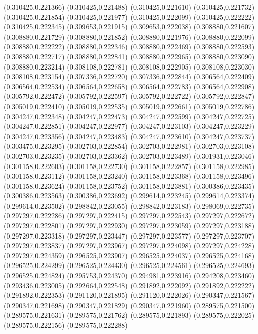(0.310425,0.221366)
(0.310425,0.221488)
(0.310425,0.221610)
(0.310425,0.221732)
(0.310425,0.221854)
(0.310425,0.221977)
(0.310425,0.222099)
(0.310425,0.222222)
(0.310425,0.222345)
(0.309653,0.221915)
(0.309653,0.222038)
(0.308880,0.221607)
(0.308880,0.221729)
(0.308880,0.221852)
(0.308880,0.221976)
(0.308880,0.222099)
(0.308880,0.222222)
(0.308880,0.222346)
(0.308880,0.222469)
(0.308880,0.222593)
(0.308880,0.222717)
(0.308880,0.222841)
(0.308880,0.222965)
(0.308880,0.223090)
(0.308880,0.223214)
(0.308108,0.222781)
(0.308108,0.222905)
(0.308108,0.223030)
(0.308108,0.223154)
(0.307336,0.222720)
(0.307336,0.222844)
(0.306564,0.222409)
(0.306564,0.222534)
(0.306564,0.222658)
(0.306564,0.222783)
(0.306564,0.222908)
(0.305792,0.222472)
(0.305792,0.222597)
(0.305792,0.222722)
(0.305792,0.222847)
(0.305019,0.222410)
(0.305019,0.222535)
(0.305019,0.222661)
(0.305019,0.222786)
(0.304247,0.222348)
(0.304247,0.222473)
(0.304247,0.222599)
(0.304247,0.222725)
(0.304247,0.222851)
(0.304247,0.222977)
(0.304247,0.223103)
(0.304247,0.223229)
(0.304247,0.223356)
(0.304247,0.223483)
(0.304247,0.223610)
(0.304247,0.223737)
(0.303475,0.223295)
(0.302703,0.222854)
(0.302703,0.222981)
(0.302703,0.223108)
(0.302703,0.223235)
(0.302703,0.223362)
(0.302703,0.223489)
(0.301931,0.223046)
(0.301158,0.222603)
(0.301158,0.222730)
(0.301158,0.222857)
(0.301158,0.222985)
(0.301158,0.223112)
(0.301158,0.223240)
(0.301158,0.223368)
(0.301158,0.223496)
(0.301158,0.223624)
(0.301158,0.223752)
(0.301158,0.223881)
(0.300386,0.223435)
(0.300386,0.223563)
(0.300386,0.223692)
(0.299614,0.223245)
(0.299614,0.223374)
(0.299614,0.223502)
(0.298842,0.223055)
(0.298842,0.223183)
(0.298069,0.222735)
(0.297297,0.222286)
(0.297297,0.222415)
(0.297297,0.222543)
(0.297297,0.222672)
(0.297297,0.222801)
(0.297297,0.222930)
(0.297297,0.223059)
(0.297297,0.223188)
(0.297297,0.223318)
(0.297297,0.223447)
(0.297297,0.223577)
(0.297297,0.223707)
(0.297297,0.223837)
(0.297297,0.223967)
(0.297297,0.224098)
(0.297297,0.224228)
(0.297297,0.224359)
(0.296525,0.223907)
(0.296525,0.224037)
(0.296525,0.224168)
(0.296525,0.224299)
(0.296525,0.224430)
(0.296525,0.224561)
(0.296525,0.224693)
(0.296525,0.224824)
(0.295753,0.224370)
(0.294981,0.223916)
(0.294208,0.223460)
(0.293436,0.223005)
(0.292664,0.222548)
(0.291892,0.222092)
(0.291892,0.222222)
(0.291892,0.222353)
(0.291120,0.221895)
(0.291120,0.222026)
(0.290347,0.221567)
(0.290347,0.221698)
(0.290347,0.221829)
(0.290347,0.221960)
(0.289575,0.221500)
(0.289575,0.221631)
(0.289575,0.221762)
(0.289575,0.221893)
(0.289575,0.222025)
(0.289575,0.222156)
(0.289575,0.222288)

